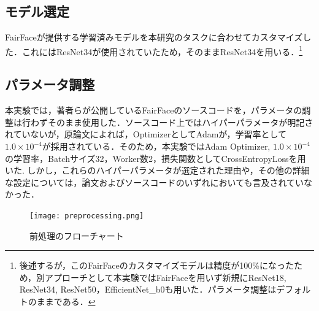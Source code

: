 \documentclass[a4paper,11pt,titlepage]{jsarticle}
\begin{document}
\subsection{モデル選定}
FairFaceが提供する学習済みモデルを本研究のタスクに合わせてカスタマイズした．これにはResNet34が使用されていたため，そのままResNet34を用いる．\footnote{後述するが，このFairFaceのカスタマイズモデルは精度が100\%になったため，別アプローチとして本実験ではFairFaceを用いず新規にResNet18, ResNet34, ResNet50，EfficientNet\_b0も用いた．パラメータ調整はデフォルトのままである．}


\subsection{パラメータ調整}
本実験では，著者らが公開しているFairFaceのソースコード\cite{FairFaceGitHub}を，パラメータの調整は行わずそのまま使用した．ソースコード上ではハイパーパラメータが明記されていないが，原論文\cite{karkkainenFairFace}によれば，OptimizerとしてAdamが，学習率として$1.0 \times 10^{-4}$が採用されている．そのため，本実験ではAdam Optimizer, $1.0 \times 10^{-4}$の学習率，Batchサイズ32，Worker数2，損失関数としてCrossEntropyLossを用いた. しかし，これらのハイパーパラメータが選定された理由や，その他の詳細な設定については，論文\cite{karkkainenFairFace}およびソースコード\cite{FairFaceGitHub}のいずれにおいても言及されていなかった．




\begin{figure}[htbp]
    \centering
    \texttt{[image: preprocessing.png]}
    \caption{前処理のフローチャート}
    \label{fig:prepro}
\end{figure}
\end{document}
